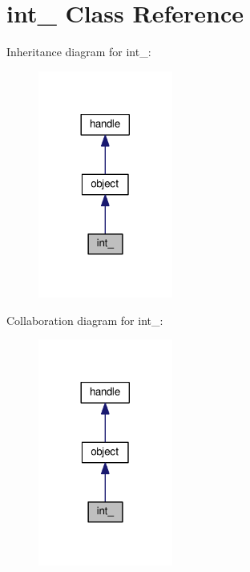 \hypertarget{classint__}{}\section{int\+\_\+ Class Reference}
\label{classint__}


Inheritance diagram for int\+\_\+\+:
\nopagebreak
\begin{figure}[H]
\begin{center}
\leavevmode
\includegraphics[width=125pt]{classint____inherit__graph}
\end{center}
\end{figure}


Collaboration diagram for int\+\_\+\+:
\nopagebreak
\begin{figure}[H]
\begin{center}
\leavevmode
\includegraphics[width=125pt]{classint____coll__graph}
\end{center}
\end{figure}
